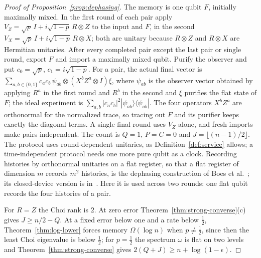 \documentclass[11pt,a4paper]{article}
\theoremstyle{plain}
\theoremstyle{definition}
\theoremstyle{remark}
\begin{document}
\begin{proof}[Proof of Proposition~\ref{prop:dephasing}]
The memory is one qubit $F$, initially maximally mixed. In the first round of each pair apply
$V_Z=\sqrt p\,I+i\sqrt{1-p}\,R\otimes Z$ to the input and $F$, in the second $V_X=\sqrt p\,I+i\sqrt{1-p}\,R\otimes X$; both are unitary
because $R\otimes Z$ and $R\otimes X$ are Hermitian unitaries. After every completed pair except the last pair or single round,
export $F$ and import a maximally mixed qubit. Purify the observer and put $c_0=\sqrt p$, $c_1=i\sqrt{1-p}$. For a pair, the actual
final vector is $\sum_{a,b\in\{0,1\}}c_ac_b\,\psi_{ab}\otimes(X^bZ^a\otimes I)\xi$, where $\psi_{ab}$ is the observer vector obtained by
applying $R^a$ in the first round and $R^b$ in the second and $\xi$ purifies the flat state of $F$; the ideal experiment is
$\sum_{a,b}|c_ac_b|^2|\psi_{ab}\rangle\langle\psi_{ab}|$. The four operators $X^bZ^a$ are orthonormal for the normalized trace, so tracing
out $F$ and its purifier keeps exactly the diagonal terms. A single final round uses $V_Z$ alone, and fresh imports make pairs
independent. The count is $Q=1$, $P=C=0$ and $J=\lfloor(n-1)/2\rfloor$. The protocol uses round-dependent unitaries, as
Definition~\ref{def:service} allows; a time-independent protocol needs one more pure qubit as a clock. Recording histories by
orthonormal unitaries on a flat register, so that a flat register of dimension $m$ records $m^2$ histories, is the dephasing construction of
Boes et al.~\cite[Lemma~1]{BoesWilming2018}; its closed-device version is in~\cite[Section~7]{Douglas2026closed}. Here it is used across two
rounds: one flat qubit records the four histories of a pair.

For $R=Z$ the Choi rank is $2$. At zero error Theorem~\ref{thm:strong-converse}(c) gives $J\ge n/2-Q$. At a fixed error below one and a
rate below $\frac12$, Theorem~\ref{thm:log-lower} forces memory $\Omega(\log n)$ when $p\ne\frac12$, since then the least Choi eigenvalue
is below $\frac12$; for $p=\frac12$ the spectrum $\omega$ is flat on two levels and Theorem~\ref{thm:strong-converse} gives
$2(Q+J)\ge n+\log(1-\epsilon)$.
\end{proof}
\end{document}
